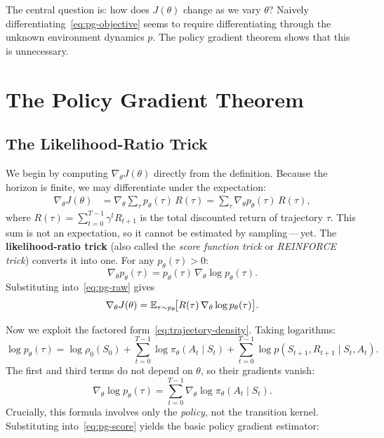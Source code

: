 The central question is: how does $J(\theta)$ change as we vary $\theta$?  Naively differentiating~\eqref{eq:pg-objective} seems to require differentiating through the unknown environment dynamics $p$.  The policy gradient theorem shows that this is unnecessary.

\section{The Policy Gradient Theorem}
\label{sec:pg-theorem}


\subsection{The Likelihood-Ratio Trick}

We begin by computing $\nabla_\theta J(\theta)$ directly from the definition.  Because the horizon is finite, we may differentiate under the expectation:
\begin{align}
\nabla_\theta J(\theta)
&= \nabla_\theta \sum_\tau p_\theta(\tau)\, R(\tau)
= \sum_\tau \nabla_\theta p_\theta(\tau)\, R(\tau),
\label{eq:pg-raw}
\end{align}
where $R(\tau) = \sum_{t=0}^{T-1} \gamma^t R_{t+1}$ is the total discounted return of trajectory $\tau$.  This sum is not an expectation, so it cannot be estimated by sampling\,---\,yet.  The \textbf{likelihood-ratio trick} (also called the \emph{score function trick} or \emph{REINFORCE trick}) converts it into one.  For any $p_\theta(\tau) > 0$:
\begin{equation}
\label{eq:log-derivative}
\nabla_\theta p_\theta(\tau) = p_\theta(\tau)\, \nabla_\theta \log p_\theta(\tau).
\end{equation}
Substituting into~\eqref{eq:pg-raw} gives
\begin{equation}
\label{eq:pg-score}
\nabla_\theta J(\theta) = \operatorname{\mathbb{E}}_{\tau \sim p_\theta}\!\bigl[R(\tau)\, \nabla_\theta \log p_\theta(\tau)\bigr].
\end{equation}

Now we exploit the factored form~\eqref{eq:trajectory-density}.  Taking logarithms:
\[
\log p_\theta(\tau) = \log \rho_0(S_0) + \sum_{t=0}^{T-1} \log \pi_\theta(A_t \mid S_t) + \sum_{t=0}^{T-1} \log p(S_{t+1}, R_{t+1} \mid S_t, A_t).
\]
The first and third terms do not depend on $\theta$, so their gradients vanish:
\begin{equation}
\label{eq:log-traj-grad}
\nabla_\theta \log p_\theta(\tau) = \sum_{t=0}^{T-1} \nabla_\theta \log \pi_\theta(A_t \mid S_t).
\end{equation}
Crucially, this formula involves only the \emph{policy}, not the transition kernel.  Substituting into~\eqref{eq:pg-score} yields the basic policy gradient estimator:

